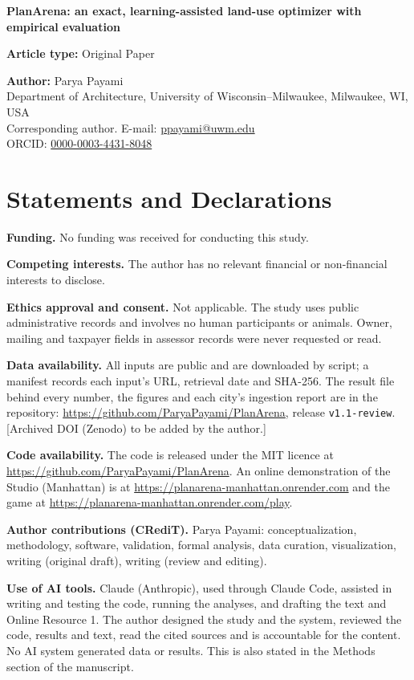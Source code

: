 \documentclass[11pt]{article}
\begin{document}
{\large\textbf{PlanArena: an exact, learning-assisted land-use optimizer with empirical evaluation}}

\textbf{Article type:} Original Paper

\textbf{Author:} Parya Payami\\
Department of Architecture, University of Wisconsin--Milwaukee, Milwaukee, WI, USA\\
Corresponding author. E-mail: \href{mailto:ppayami@uwm.edu}{ppayami@uwm.edu}\\
ORCID: \href{https://orcid.org/0000-0003-4431-8048}{0000-0003-4431-8048}

\section*{Statements and Declarations}

\textbf{Funding.} No funding was received for conducting this study.

\textbf{Competing interests.} The author has no relevant financial or non-financial interests to disclose.

\textbf{Ethics approval and consent.} Not applicable. The study uses public administrative records and involves no
human participants or animals. Owner, mailing and taxpayer fields in assessor records were never requested or read.

\textbf{Data availability.} All inputs are public and are downloaded by script; a manifest records each input's URL,
retrieval date and SHA-256. The result file behind every number, the figures and each city's ingestion report are in
the repository: \url{https://github.com/ParyaPayami/PlanArena}, release \texttt{v1.1-review}. [Archived DOI (Zenodo) to be added by the author.]

\textbf{Code availability.} The code is released under the MIT licence at \url{https://github.com/ParyaPayami/PlanArena}. An online
demonstration of the Studio (Manhattan) is at \url{https://planarena-manhattan.onrender.com} and the game at \url{https://planarena-manhattan.onrender.com/play}.

\textbf{Author contributions (CRediT).} Parya Payami: conceptualization, methodology, software, validation, formal
analysis, data curation, visualization, writing (original draft), writing (review and editing).

\textbf{Use of AI tools.} Claude (Anthropic), used through Claude Code, assisted in writing and testing the code,
running the analyses, and drafting the text and Online Resource 1. The author designed the study and the system,
reviewed the code, results and text, read the cited sources and is accountable for the content. No AI system generated
data or results. This is also stated in the Methods section of the manuscript.
\end{document}

